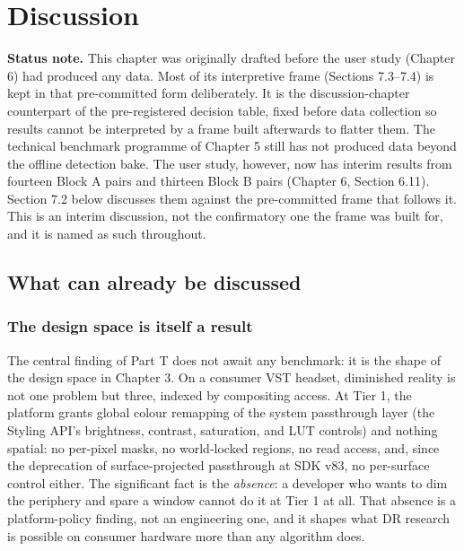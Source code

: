 \chapter{Discussion}

\textbf{Status note.} This chapter was originally drafted before the user study (Chapter 6) had
produced any data. Most of its interpretive frame (Sections 7.3–7.4) is kept in that pre-committed
form deliberately. It is the discussion-chapter counterpart of the pre-registered decision table,
fixed before data collection so results cannot be interpreted by a frame built afterwards to flatter
them. The technical benchmark programme of Chapter 5 still has not produced data beyond the offline
detection bake. The user study, however, now has interim results from fourteen Block A pairs and
thirteen Block B pairs (Chapter 6, Section 6.11). Section 7.2 below discusses them against the pre-committed frame that
follows it. This is an interim discussion, not the confirmatory one the frame was built for, and it
is named as such throughout.

\section{What can already be discussed}

\subsection{The design space is itself a result}

The central finding of Part T does not await any benchmark: it is the shape of the design space in
Chapter 3. On a consumer VST headset, diminished reality is not one problem but three, indexed by
compositing access. At Tier 1, the platform grants global colour remapping of the system passthrough
layer (the Styling API's brightness, contrast, saturation, and LUT controls) and nothing spatial: no
per-pixel masks, no world-locked regions, no read access, and, since the deprecation of
surface-projected passthrough at SDK v83, no per-surface control either. The significant fact is
the \textit{absence}: a developer who wants to dim the periphery and spare a window cannot do it at Tier 1
at all. That absence is a platform-policy finding, not an engineering one, and it shapes what DR
research is possible on consumer hardware more than any algorithm does.

